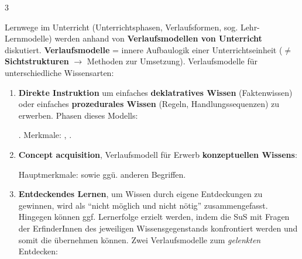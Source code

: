 \begin{landscape}
\begin{multicols*}{3}
\begin{myBox}[title=``Unterrichtsplanung und Methoden'' \cite{kaiser}]
\begin{enumerate}
\begin{enumerate}
\end{enumerate}
\end{enumerate}
\end{myBox}\begin{myBox}[title=``Lehr-Lernprozesse in der Schule: Studium'' \cite{maier}]
Lernwege im Unterricht (Unterrichtsphasen, Verlaufsformen, sog. Lehr-Lernmodelle) werden anhand von \textbf{Verlaufsmodellen von Unterricht} diskutiert.  \textbf{Verlaufsmodelle} = innere Aufbaulogik einer Unterrichtseinheit ($\neq$ \textbf{Sichtstrukturen} $\rightarrow$ Methoden zur Umsetzung). Verlaufsmodelle für unterschiedliche Wissensarten:
\begin{enumerate}
\item \textbf{Direkte Instruktion} um einfaches \textbf{deklatratives Wissen} (Faktenwissen) oder einfaches \textbf{prozedurales Wissen} (Regeln, Handlungssequenzen) zu erwerben. Phasen dieses Modells: . Merkmale:  , .
\item \textbf{Concept acquisition}, Verlaufsmodell für Erwerb \textbf{konzeptuellen Wissens}: 
Hauptmerkmale:  sowie  ggü. anderen Begriffen.
\item \textbf{Entdeckendes Lernen}, um Wissen durch eigene Entdeckungen zu gewinnen, wird als ``nicht möglich und nicht nötig'' zusammengefasst. Hingegen können ggf. Lernerfolge erzielt werden, indem die SuS mit Fragen der ErfinderInnen des jeweiligen Wissensgegenstands konfrontiert werden und somit die  übernehmen können. Zwei Verlaufsmodelle zum \textit{gelenkten} Entdecken:

\end{enumerate}
\end{myBox}
\end{multicols*}
\end{landscape}
